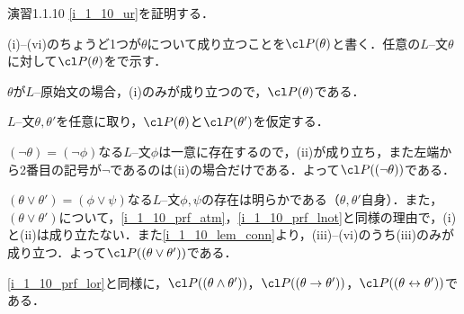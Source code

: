 \begin{excfield}{演習1.1.10}
  \cref{i_1_10_ur}を証明する．

  (i)--(vi)のちょうど1つが$\theta$について成り立つことを$\cl P (\theta)$と書く．任意の$L$--文$\theta$に対して$\cl P (\theta)$をで示す．
  \begin{step}
    \item \label{i_1_10_prf_atm}
    $\theta$が$L$--原始文の場合，(i)のみが成り立つので，$\cl P (\theta)$である．
  \end{step}
  $L$--文$\theta, \theta'$を任意に取り，$\cl P (\theta)$と$\cl P (\theta')$を仮定する．
  \begin{step}[resume]
    \item \label{i_1_10_prf_lnot}
    $(\lnot \theta) = (\lnot \phi)$なる$L$--文$\phi$は一意に存在するので，(ii)が成り立ち，また左端から2番目の記号が$\lnot$であるのは(ii)の場合だけである．よって$\cl P ((\lnot \theta))$である．
    \item \label{i_1_10_prf_lor}
    $(\theta \lor \theta') = (\phi \lor \psi)$なる$L$--文$\phi, \psi$の存在は明らかである（$\theta, \theta'$自身）．また，$(\theta \lor \theta')$について，\ref{i_1_10_prf_atm}，\ref{i_1_10_prf_lnot}と同様の理由で，(i)と(ii)は成り立たない．また\cref{i_1_10_lem_conn}より，(iii)--(vi)のうち(iii)のみが成り立つ．よって$\cl P ((\theta \lor \theta'))$である．
    \item \ref{i_1_10_prf_lor}と同様に，$\cl P ((\theta \land \theta'))$，$\cl P ((\theta \ra \theta'))$，$\cl P ((\theta \lra \theta'))$である．
  \end{step}
\end{excfield}



